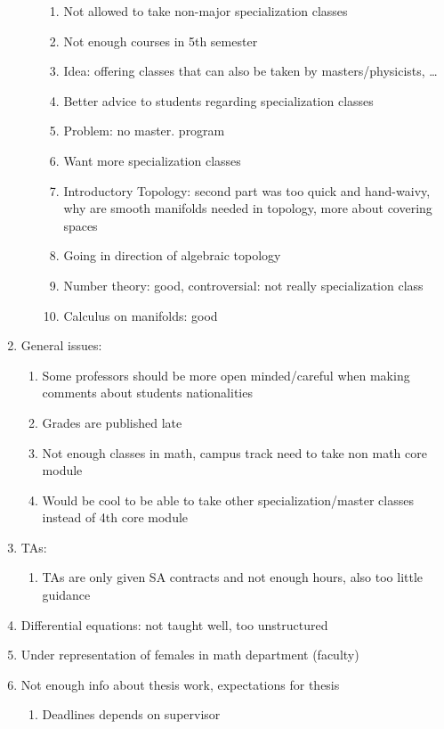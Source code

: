 \begin{enumerate}
\begin{enumerate}
\begin{enumerate}
\item Not allowed to take non-major specialization classes
\item Not enough courses in 5th semester
\item Idea: offering classes that can also be taken by masters/physicists, \ldots{}
\item Better advice to students regarding specialization classes
\item Problem: no master. program
\item Want more specialization classes
\item Introductory Topology: second part was too quick and hand-waivy, why are smooth manifolds needed in topology, more about covering spaces
\item Going in direction of algebraic topology
\item Number theory: good, controversial: not really specialization class
\item Calculus on manifolds: good
\end{enumerate}
\end{enumerate}
\item General issues:
\begin{enumerate}
\item Some professors should be more open minded/careful when making comments about students nationalities
\item Grades are published late
\item Not enough classes in math, campus track need to take non math core module
\item Would be cool to be able to take other specialization/master classes instead of 4th core module
\end{enumerate}
\item TAs:
\begin{enumerate}
\item TAs are only given SA contracts and not enough hours, also too little guidance
\end{enumerate}
\item Differential equations: not taught well, too unstructured
\item Under representation of females in math department (faculty)
\item Not enough info about thesis work, expectations for thesis
\begin{enumerate}
\item Deadlines depends on supervisor
\end{enumerate}

\end{enumerate}
